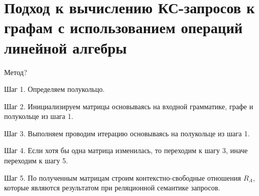\chapter{Подход к вычислению КС-запросов к графам с использованием операций линейной алгебры}\label{ch:ch2}

Метод?

Шаг 1. Определяем полукольцо.

Шаг 2. Инициализируем матрицы основываясь на входной грамматике, графе и полукольце из шага 1.

Шаг 3. Выполняем проводим итерацию основываясь на полукольце из шага 1.

Шаг 4. Если хотя бы одна матрица изменилась, то переходим к шагу 3, иначе переходим к шагу 5.

Шаг 5. По полученным матрицам строим контекстно-свободные отношения $R_A$, которые являются результатом при реляционной семантике запросов.


\FloatBarrier
